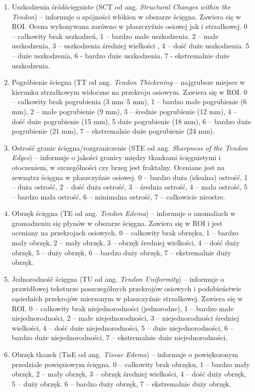 \begin{enumerate}
	\item Uszkodzenia śródścięgniste (SCT od ang. \textit{Structural Changes within the Tendon}) -- informuje o spójności włókien w obszarze ścięgna. Zawiera się w ROI. Ocena wykonywana zarówno w płaszczyźnie osiowej jak i strzałkowej. 0 – całkowity brak uszkodzeń, 1 – bardzo małe uszkodzenia. 2 – małe uszkodzenia, 3 – uszkodzenia średniej wielkości , 4 – dość duże uszkodzenia. 5 – duże uszkodzenia, 6 - bardzo duże uszkodzenia, 7 - ekstremalnie duże uszkodzenia.
	\item Pogróbienie ściegna (TT od ang. \textit{Tendon Thickening} -- najgrubsze miejsce w kierunku strzałkowym widoczne na przekroju osiowym. Zawiera się w ROI. 0 – całkowity brak pogrubienia (3 mm--5 mm), 1 – bardzo małe pogrubienie (6 mm), 2 – małe pogrubienie (9 mm), 3 – średnie pogrubienie (12 mm), 4 –  dość duże pogrubienie (15 mm), 5 duże pogrubienie (18 mm), 6 – bardzo duże pogrubienie (21 mm), 7 – ekstremalnie duże pogrubienie (24 mm).
	\item Ostrość granic ścięgna/rozgraniczenie (STE od ang. \textit{Sharpness of the Tendon Edges}) -- informuje o jakości granicy między tkankami ścięgnistymi i otoczeniem, w szczególności czy brzeg jest fraktalny. Oceniane jest na zewnątrz ścięgna w płaszczyźnie osiowej. 0 – bardzo duża (idealna) ostrość, 1 – duża ostrość, 2 – dość duża ostrość, 3 – średnia ostrość, 4 – mała ostrość, 5 – bardzo mała ostrość, 6 – minimalna ostrość, 7 – całkowicie nieostre.
	\item Obrzęk ścięgna (TE od ang. \textit{Tendon Edema}) -- informuje o anomaliach w gromadzeniu się płynów w obszarze ścięgna. Zawiera się w ROI i jest oceniany na przekrojach osiowych. 0 – całkowity brak obrzęku, 1 – bardzo mały obrzęk, 2 – mały obrzęk, 3 – obrzęk średniej wielkości, 4 – dość duży obrzęk, 5 – duży obrzęk, 6 – bardzo duży obrzęk, 7 -- ekstremalnie duży obrzęk.
	\item Jednorodność ścięgna (TU od ang. \textit{Tendon Uniformity}) -- informuje o prawidłowej teksturze poszczególnych przekrojów osiowych i podobieństwie sąsiednich przekrojów mierzonym w płaszczyźnie strzałkowej. Zawiera się w ROI. 0 – całkowity brak niejednorodności (jednorodne), 1 – bardzo małe niejednorodności, 2 – małe niejednorodności, 3 – niejednorodności średniej wielkości, 4 – dość duże niejednorodności, 5 – duże niejednorodności, 6 – bardzo duże niejednorodności, 7 –  ekstremalnie duże niejednorodności. 
	\item Obrzęk tkanek (TisE od ang. \textit{Tissue Edema}) -- informuje o powiększonym przedziale powięziowym ścięgna. 0  – całkowity brak obrzęku, 1 – bardzo mały obrzęk, 2 – mały obrzęk, 3 – obrzęk średniej wielkości, 4 – dość duży obrzęk, 5 – duży obrzęk. 6 – bardzo duży obrzęk, 7 -- ekstremalnie duży obrzęk.
\end{enumerate}

